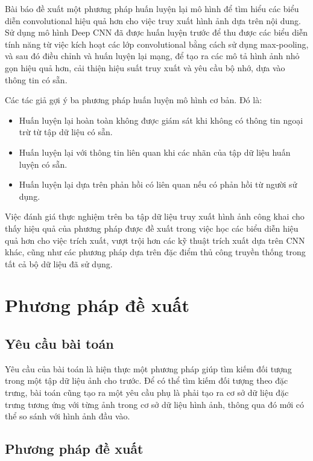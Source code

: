 \documentclass[a4paper,14pt]{extreport}
\begin{document}
Bài báo đề xuất một phương pháp huấn luyện lại mô hình để tìm hiểu các biểu diễn convolutional hiệu quả hơn cho việc truy xuất hình ảnh dựa trên nội dung. Sử dụng mô hình Deep CNN đã được huấn luyện trước để thu được các biểu diễn tính năng từ việc kích hoạt các lớp convolutional bằng cách sử dụng max-pooling, và sau đó điều chỉnh và huấn luyện lại mạng, để tạo ra các mô tả hình ảnh nhỏ gọn hiệu quả hơn, cải thiện hiệu suất truy xuất và yêu cầu bộ nhớ, dựa vào thông tin có sẵn. 

Các tác giả gợi ý ba phương pháp huấn luyện mô hình cơ bản. 
Đó là:
\begin{itemize}
        \item Huấn luyện lại hoàn toàn không được giám sát khi không có thông tin ngoại trừ từ tập dữ liệu có sẵn. 
        \item Huấn luyện lại với thông tin liên quan khi các nhãn của tập dữ liệu huấn luyện có sẵn.
        \item Huấn luyện lại dựa trên phản hồi có liên quan nếu có phản hồi từ người sử dụng. 
\end{itemize}

Việc đánh giá thực nghiệm trên ba tập dữ liệu truy xuất hình ảnh công khai cho thấy hiệu quả của phương pháp được đề xuất trong việc học các biểu diễn hiệu quả hơn cho việc trích xuất, vượt trội hơn các kỹ thuật trích xuất dựa trên CNN khác, cũng như các phương pháp dựa trên đặc điểm thủ công truyền thống trong tất cả bộ dữ liệu đã sử dụng.




\chapter{Phương pháp đề xuất}
\section{Yêu cầu bài toán}
Yêu cầu của bài toán là hiện thực một phương pháp giúp tìm kiếm đối tượng trong một tập dữ liệu ảnh cho trước. 
Để có thể tìm kiếm đối tượng theo đặc trưng, bài toán cũng tạo ra một yêu cầu phụ là phải tạo ra cơ sở 
dữ liệu đặc trưng tương ứng với từng ảnh trong cơ sở dữ liệu hình ảnh, thông qua đó mới có thể so sánh 
với hình ảnh đầu vào.

\section{ Phương pháp đề xuất }
\end{document}
